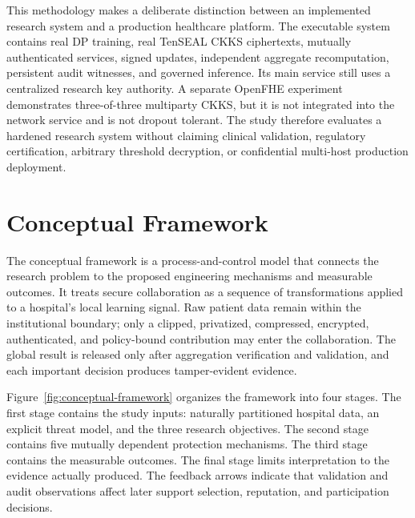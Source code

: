 This methodology makes a deliberate distinction between an implemented research system and a production healthcare platform. The executable system contains real DP training, real TenSEAL CKKS ciphertexts, mutually authenticated services, signed updates, independent aggregate recomputation, persistent audit witnesses, and governed inference. Its main service still uses a centralized research key authority. A separate OpenFHE experiment demonstrates three-of-three multiparty CKKS, but it is not integrated into the network service and is not dropout tolerant. The study therefore evaluates a hardened research system without claiming clinical validation, regulatory certification, arbitrary threshold decryption, or confidential multi-host production deployment.

\section{Conceptual Framework}
\label{sec:conceptual-framework}

The conceptual framework is a process-and-control model that connects the research problem to the proposed engineering mechanisms and measurable outcomes. It treats secure collaboration as a sequence of transformations applied to a hospital's local learning signal. Raw patient data remain within the institutional boundary; only a clipped, privatized, compressed, encrypted, authenticated, and policy-bound contribution may enter the collaboration. The global result is released only after aggregation verification and validation, and each important decision produces tamper-evident evidence.

Figure~\ref{fig:conceptual-framework} organizes the framework into four stages. The first stage contains the study inputs: naturally partitioned hospital data, an explicit threat model, and the three research objectives. The second stage contains five mutually dependent protection mechanisms. The third stage contains the measurable outcomes. The final stage limits interpretation to the evidence actually produced. The feedback arrows indicate that validation and audit observations affect later support selection, reputation, and participation decisions.

